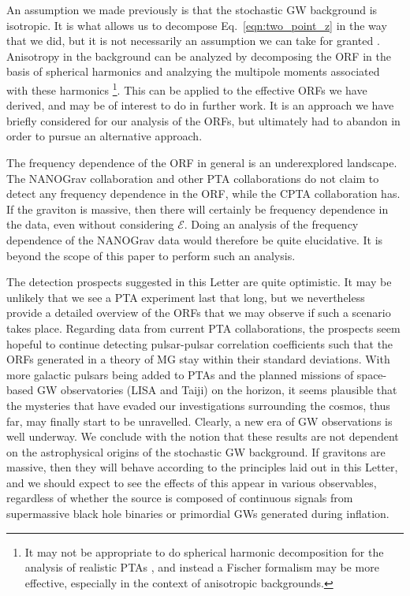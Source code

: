 \documentclass[prd,twocolumn,aps,psfig,nofootinbib,nobibnotes,superscriptaddress,preprintnumbers,times]{revtex4-2}
\begin{document}
An assumption we made previously is that the stochastic GW background is isotropic. It is what allows us to decompose Eq.\ \ref{eqn:two_point_z} in the way that we did, but it is not necessarily an assumption we can take for granted \cite{Depta:2024ykq, Bravo:2025csu, Cusin:2025xle, Kuwahara:2024jiz, Li:2024lvt}. Anisotropy in the background can be analyzed by decomposing the ORF in the basis of spherical harmonics and analzying the multipole moments associated with these harmonics \cite{Allen:2024bnk, Gair:2014rwa}\footnote{It may not be appropriate to do spherical harmonic decomposition for the analysis of realistic PTAs \cite{Ali-Haimoud:2020ozu}, and instead a Fischer formalism may be more effective, especially in the context of anisotropic backgrounds.}. This can be applied to the effective ORFs we have derived, and may be of interest to do in further work. It is an approach we have briefly considered for our analysis of the ORFs, but ultimately had to abandon in order to pursue an alternative approach.

The frequency dependence of the ORF in general is an underexplored landscape. The NANOGrav collaboration and other PTA collaborations do not claim to detect any frequency dependence in the ORF, while the CPTA collaboration has. If the graviton is massive, then there will certainly be frequency dependence in the data, even without considering $\mathcal{E}$. Doing an analysis of the frequency dependence of the NANOGrav data would therefore be quite elucidative. It is beyond the scope of this paper to perform such an analysis.

The detection prospects suggested in this Letter are quite optimistic. It may be unlikely that we see a PTA experiment last that long, but we nevertheless provide a detailed overview of the ORFs that we may observe if such a scenario takes place. Regarding data from current PTA collaborations, the prospects seem hopeful to continue detecting pulsar-pulsar correlation coefficients such that the ORFs generated in a theory of MG  stay within their standard deviations. With more galactic pulsars being added to PTAs and the planned missions of space-based GW observatories (LISA and Taiji) on the horizon, it seems plausible that the mysteries that have evaded our investigations surrounding the cosmos, thus far, may finally start to be unravelled. Clearly, a new era of GW observations is well underway. We conclude with the notion that these results are not dependent on the astrophysical origins of the stochastic GW background. If gravitons are massive, then they will behave according to the principles laid out in this Letter, and we should expect to see the effects of this appear in various observables, regardless of whether the source is composed of continuous signals from supermassive black hole binaries or primordial GWs generated during inflation.
\end{document}
